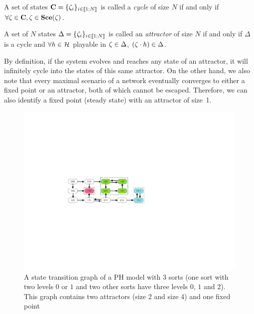 
\begin{definition}
\label{def:cycle}
\label{def:attractor}
A set of states $\mathbf{C} = \{ \zeta_{i} \}_{i \in \llbracket 1; N \rrbracket}$
is called a \emph{cycle} of size $N$ if and only if $\forall \zeta \in \mathbf{C}, \zeta \in \mathbf{Sce}(\zeta)$.

A set of $N$ states $\Delta = \{ \zeta_{i} \}_{i \in \llbracket 1; N \rrbracket}$
is called an \emph{attractor} of size $N$ if and only if $\Delta$ is a cycle and $\forall h \in \mathcal{H} $ playable in $\zeta \in \Delta$, $(\zeta \cdot h) \in \Delta$.
\end{definition}


By definition, if the system evolves and reaches any state of an attractor, it will infinitely cycle into the states of this same attractor.
On the other hand, we also note that every maximal scenario of a network eventually converges to either a fixed point or an attractor, both of which cannot be escaped.
Therefore, we can also identify a fixed point (\ie steady state) with an attractor of size~1.

\begin{figure}[t]
   \caption{\label{fig:transition-graph} A state transition graph of a PH model with 3 sorts (one sort with two levels $0$ or $1$ and two other sorts have three levels $0$, $1$ and $2$). This graph contains two attractors (size 2 and size 4) and one fixed point}
   \includegraphics{figures/transition-graph.pdf}
\end{figure}

